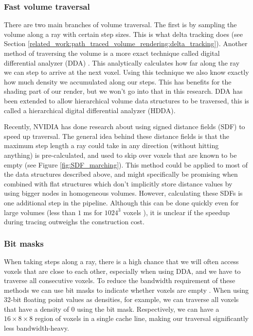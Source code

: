 \subsubsection{Fast volume traversal} \label{related_work:attribute_separation:fast_volume_traversal}
There are two main branches of volume traversal. The first is by sampling the volume along a ray with certain step sizes. This is what delta tracking does (see Section \ref{related_work:path_traced_volume_rendering:delta_tracking}). Another method of traversing the volume is a more exact technique called digital differential analyzer (DDA) \cite{amanatides1987fast}. This analytically calculates how far along the ray we can step to arrive at the next voxel. Using this technique we also know exactly how much density we accumulated along our steps. This has benefits for the shading part of our render, but we won't go into that in this research. DDA has been extended to allow hierarchical volume data structures to be traversed, this is called a hierarchical digital differential analyzer (HDDA)\cite{laine2010efficient}.


Recently, NVIDIA has done research about using signed distance fields (SDF) to speed up traversal\cite{soderlund2022ray}. The general idea behind these distance fields is that the maximum step length a ray could take in any direction (without hitting anything) is pre-calculated, and used to skip over voxels that are known to be empty (see Figure \ref{fig:SDF_marching}). This method could be applied to most of the data structures described above, and might specifically be promising when combined with flat structures which don't implicitly store distance values by using bigger nodes in homogeneous volumes. However, calculating these SDFs is one additional step in the pipeline. Although this can be done quickly even for large volumes (less than $1$ ms for $1024^3$ voxels \cite{cao2010parallel}), it is unclear if the speedup during tracing outweighs the construction cost.
\subsubsection{Bit  masks} \label{related_work:attribute_separation:bitmasks}
When taking steps along a ray, there is a high chance that we will often access voxels that are close to each other, especially when using DDA, and we have to traverse all consecutive voxels. To reduce the bandwidth requirement of these methods we can use bit masks to indicate whether voxels are empty \cite{van2015real}\cite{museth2013vdb}. When using 32-bit floating point values as densities, for example, we can traverse all voxels that have a density of $0$ using the bit mask. Respectively, we can have a $16\times8\times8$ region of voxels in a single cache line, making our traversal significantly less bandwidth-heavy.

